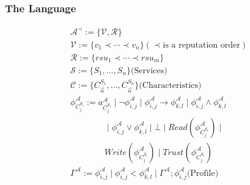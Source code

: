 \documentclass{beamer}
\begin{document}
\begin{frame}
	\label{error3}
	\frametitle{The Language}
	\smallskip

  \begin{definition}\label{def:syntax} %
  	\begin{displaymath}
  	\begin{array}{l}
          \mathcal{A}^{\prec}:= \{\mathcal{V, R}\}\\
          \mathcal{V}:= \{v_{1}\prec \cdots \prec v_{n}\} (\prec \textrm{is a
            reputation order})\\
          \mathcal{R}:= \{rsu_{1}\prec\cdots \prec rsu_{m}\}\\
          \mathcal{S}:= \{S_1, \dots, S_{n}\} \textrm{(Services)}\\  %
          \mathcal{C}:= \{C^{S_1}_{\overrightarrow{n}},  \dots,
          C^{S_{n}}_{\overrightarrow{n}}\} \textrm{(Characteristics)}\\  %
          \phi^{\mathcal{A}}_{C^{S_{i}}_{j}}:= a^{\mathcal{A}}_{C^{S_{i}}_{j}}\mid \neg \phi^{\mathcal{A}}_{i,j}\mid \phi^{\mathcal{A}}_{i,j}\rightarrow \phi^{\mathcal{A}}_{k,l}\mid \phi^{\mathcal{A}}_{i,j}\wedge \phi^{\mathcal{A}}_{k,l}\\
          \qquad \qquad \mid \phi^{\mathcal{A}}_{i,j}\vee \phi^{\mathcal{A}}_{k,l} \mid \bot \mid Read(\phi^{\mathcal{A}}_{C^{S_{i}}_{j}})\mid\\
          \qquad \qquad Write(\phi^{\mathcal{A}}_{C^{S_{i}}_{j}})\mid Trust(\phi^{\mathcal{A}}_{C^{S_{i}}_{j}})\\
          \Gamma^{\mathcal{A}}:=
  	\phi^{\mathcal{A}}_{i,j} \mid \phi^{\mathcal{A}}_{i,j} <
        \phi^{\mathcal{A}}_{k,l} \mid \Gamma^{\mathcal{A}};
        \phi^{\mathcal{A}}_{i,j} \textrm{(Profile)}

  	\end{array}
  	\end{displaymath}
  \end{definition}
\end{frame}
\end{document}
